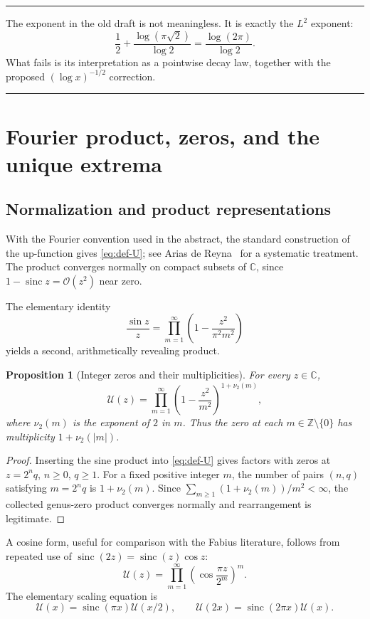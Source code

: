 \documentclass[11pt,oneside]{article}
\newtheorem{proposition}[theorem]{Proposition}
\theoremstyle{definition}
\theoremstyle{remark}
\newcommand{\C}{\mathbb C}
\newcommand{\Z}{\mathbb Z}
\newcommand{\sinc}{\operatorname{sinc}}
\newcommand{\Uhat}{\mathcal U}
\newcommand{\bigO}{\mathcal O}
\newcommand{\vtwo}{\nu_2}
\newenvironment{boxedremark}{%
  \par\smallskip\noindent\begin{center}\begin{minipage}{0.94\textwidth}%
  \color{black}\hrule\vspace{0.6em}\small
}{%
  \vspace{0.6em}\hrule\end{minipage}\end{center}\smallskip
}
\begin{document}
\begin{boxedremark}
The exponent in the old draft is not meaningless.  It is exactly the $L^2$ exponent:
\[
 \frac12+\frac{\log(\pi\sqrt2)}{\log2}
 =\frac{\log(2\pi)}{\log2}.
\]
What fails is its interpretation as a pointwise decay law, together with the proposed
$(\log x)^{-1/2}$ correction.
\end{boxedremark}

\section{Fourier product, zeros, and the unique extrema}

\subsection{Normalization and product representations}

With the Fourier convention used in the abstract, the standard construction of the
up-function gives \eqref{eq:def-U}; see Arias de Reyna~\cite{arias1982} for a systematic
treatment.  The product converges normally on compact subsets of $\C$, since
$1-\sinc z=\bigO(z^2)$ near zero.

The elementary identity
\[
 \frac{\sin z}{z}=\prod_{m=1}^{\infty}
 \left(1-\frac{z^2}{\pi^2m^2}\right)
\]
yields a second, arithmetically revealing product.

\begin{proposition}[Integer zeros and their multiplicities]\label{prop:zeros}
For every $z\in\C$,
\begin{equation}\label{eq:weierstrass-collected}
 \Uhat(z)=\prod_{m=1}^{\infty}
 \left(1-\frac{z^2}{m^2}\right)^{1+\vtwo(m)},
\end{equation}
where $\vtwo(m)$ is the exponent of $2$ in $m$.  Thus the zero at each
$m\in\Z\setminus\{0\}$ has multiplicity $1+\vtwo(|m|)$.
\end{proposition}

\begin{proof}
Inserting the sine product into \eqref{eq:def-U} gives factors with zeros at
$z=2^nq$, $n\ge0$, $q\ge1$.  For a fixed positive integer $m$, the number of pairs
$(n,q)$ satisfying $m=2^nq$ is $1+\vtwo(m)$.  Since
$\sum_{m\ge1}(1+\vtwo(m))/m^2<\infty$, the collected genus-zero product converges
normally and rearrangement is legitimate.
\end{proof}

A cosine form, useful for comparison with the Fabius literature, follows from repeated
use of $\sinc(2z)=\sinc(z)\cos z$:
\begin{equation}\label{eq:cosine-form}
 \Uhat(z)=\prod_{m=1}^{\infty}
 \left(\cos\frac{\pi z}{2^m}\right)^m.
\end{equation}
The elementary scaling equation is
\begin{equation}\label{eq:scaling}
 \Uhat(x)=\sinc(\pi x)\Uhat(x/2),
 \qquad
 \Uhat(2x)=\sinc(2\pi x)\Uhat(x).
\end{equation}
\end{document}
